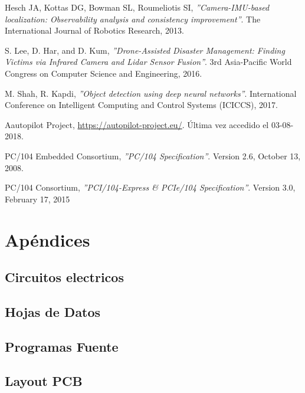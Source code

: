 \documentclass[a4paper,10pt]{article}
\numberwithin{equation}{section}
\begin{document}
\begin{thebibliography}{9}
    Hesch JA, Kottas DG, Bowman SL, Roumeliotis SI,
    \textit{''Camera-IMU-based localization: Observability analysis and consistency improvement''}.
    The International Journal of Robotics Research,
    2013.

    S. Lee, D. Har, and D. Kum,
    \textit{''Drone-Assisted Disaster Management: Finding Victims via Infrared Camera and Lidar Sensor Fusion''}.
    3rd Asia-Pacific World Congress on Computer Science and Engineering, 
    2016.

    M. Shah, R. Kapdi,
    \textit{''Object detection using deep neural networks''}.
     International Conference on Intelligent Computing and Control Systems (ICICCS),
     2017.
     
    Aautopilot Project,
    \url{https://autopilot-project.eu/}.
    Última vez accedido el 03-08-2018.

    PC/104 Embedded Consortium,
    \textit{''PC/104 Specification''}.
    Version 2.6,
    October 13, 2008.

    PC/104 Consortium,
    \textit{''PCI/104-Express \& PCIe/104 Specification''}.
    Version 3.0,
    February 17, 2015
    
\end{thebibliography}


\newpage
\section{Apéndices}
\label{sec:8_apendix}

\subsection{Circuitos electricos}
\label{sec:9_circ}

\subsection{Hojas de Datos}
\label{sec:10_hd}

\subsection{Programas Fuente}
\label{sec:11_soft}

\subsection{Layout PCB}
\label{sec:12_pcblay}
\end{document}
